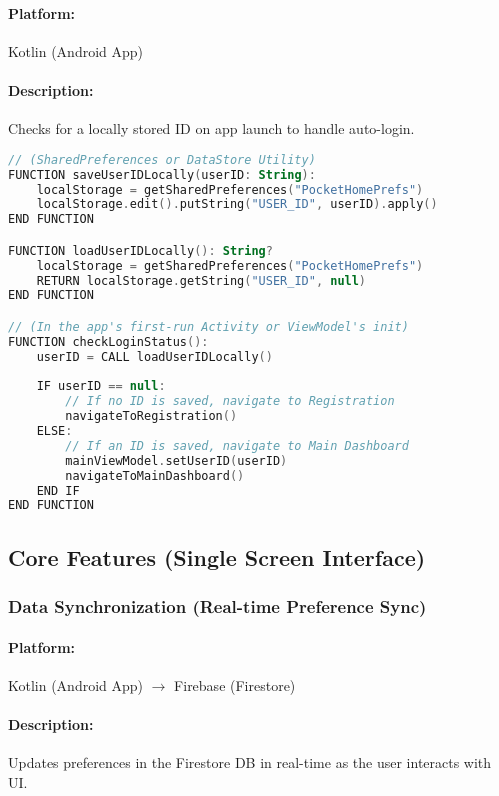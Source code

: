 \documentclass[conference]{IEEEtran}
\begin{document}
\paragraph{Platform:} Kotlin (Android App)
\paragraph{Description:} Checks for a locally stored ID on app launch to handle auto-login.

\begin{lstlisting}[language=Kotlin]
// (SharedPreferences or DataStore Utility)
FUNCTION saveUserIDLocally(userID: String):
    localStorage = getSharedPreferences("PocketHomePrefs")
    localStorage.edit().putString("USER_ID", userID).apply()
END FUNCTION

FUNCTION loadUserIDLocally(): String?
    localStorage = getSharedPreferences("PocketHomePrefs")
    RETURN localStorage.getString("USER_ID", null)
END FUNCTION

// (In the app's first-run Activity or ViewModel's init)
FUNCTION checkLoginStatus():
    userID = CALL loadUserIDLocally()
    
    IF userID == null:
        // If no ID is saved, navigate to Registration
        navigateToRegistration()
    ELSE:
        // If an ID is saved, navigate to Main Dashboard
        mainViewModel.setUserID(userID)
        navigateToMainDashboard()
    END IF
END FUNCTION
\end{lstlisting}


\subsection{Core Features (Single Screen Interface)}

\subsubsection{Data Synchronization (Real-time Preference Sync)}
\paragraph{Platform:} Kotlin (Android App) $\rightarrow$ Firebase (Firestore)
\paragraph{Description:} Updates preferences in the Firestore DB in real-time as the user interacts with UI.
\end{document}
